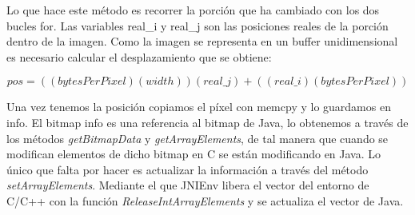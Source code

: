 Lo que hace este método es recorrer la porción que ha cambiado con los dos bucles for. Las variables real\_i y real\_j son las posiciones reales de la porción dentro de la imagen. Como la imagen se representa en un buffer unidimensional es necesario calcular el desplazamiento que se obtiene:

\begin{equation*}
pos = ((bytesPerPixel)(width))(real\_j)+((real\_i)(bytesPerPixel))
\end{equation*}

Una vez tenemos la posición copiamos el píxel con memcpy y lo guardamos en info. El bitmap info es una referencia al bitmap de Java, lo obtenemos a través de los métodos \emph{getBitmapData} y \emph{getArrayElements}, de tal manera que cuando se modifican elementos de dicho bitmap en C se están modificando en Java. Lo único que falta por hacer es actualizar la información a través del método \emph{setArrayElements}. Mediante el que JNIEnv libera el vector del entorno de C/C++ con la función  \emph{ReleaseIntArrayElements} y se actualiza el vector de Java.
